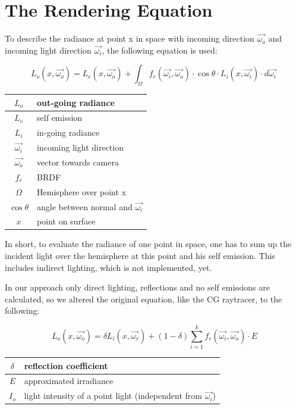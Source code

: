 \documentclass[11pt,a4paper]{article}
\begin{document}
\newpage
\section{The Rendering Equation}
\label{sec:renderingequation}
To describe the radiance at point x in space with incoming direction $\vec{\omega_o}$ and incoming light direction $\vec{\omega_i}$, the following equation\cite{Kaj86} is used:

\begin{equation}
L_o(x,\vec{\omega_o}) = L_e(x,\vec{\omega_o}) + \int_\Omega f_r(\vec{\omega_i},\vec{\omega_o}) \cdot \cos\theta \cdot L_i(x,\vec{\omega_i}) \cdot d\vec{\omega_i}\
\label{eq:renderingequation}
\end{equation}

\begin{table}[h]
\begin{tabular}{| c | l |}
\hline
$L_o$ & out-going radiance\\ \hline
$L_e$ & self emission\\ \hline
$L_i$ & in-going radiance\\ \hline
$\vec{\omega_i}$ & incoming light direction\\ \hline
$\vec{\omega_o}$ & vector towards camera\\ \hline
$f_r$ & BRDF\\ \hline
$\Omega$ & Hemisphere over point x\\ \hline
$\cos\theta$ & angle between normal and $\vec{\omega_i}$\\ \hline
$x$ & point on surface\\ \hline
\end{tabular}
\end{table}

In short, to evaluate the radiance of one point in space, one has to sum up the incident light over the hemisphere at this point and his self emission. This includes indirect lighting, which is not implemented, yet.

		
In our approach only direct lighting, reflections and no self emissions are calculated, so we altered the original equation, like the CG raytracer, to the following:

\begin{equation}
L_o(x,\vec{\omega_o}) = \delta L_i(x,\vec{\omega_r}) + (1- \delta) \sum_{i=1}^{k} f_r(\vec{\omega_i},\vec{\omega_o}) \cdot E
\label{eq:simplerenderingequation}
\end{equation}


\begin{table}[H]
\begin{tabular}{| c | l |}
\hline
$\delta$ & reflection coefficient\\ \hline
$E$ & approximated irradiance\\ \hline
$I_o$ & light intensity of a point light (independent from $\vec{\omega_i}$)\\ \hline
\end{tabular}
\end{table}
\end{document}
